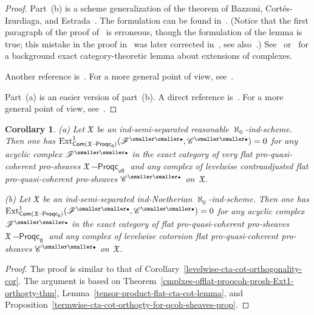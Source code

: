 \documentclass[12pt,a4paper]{amsart}
\newcommand{\+}{\protect\nobreakdash-}
\renewcommand{\:}{\colon}
\newcommand{\bu}{{\text{\smaller\smaller$\scriptstyle\bullet$}}}
\DeclareMathOperator{\Ext}{Ext}
\newcommand{\Proqc}{{\operatorname{\mathsf{--Proqc}}}}
\newcommand{\fl}{\mathsf{fl}}
\newcommand{\vfl}{\mathsf{vfl}}
\newcommand{\Com}{\mathsf{Com}}
\newcommand{\fX}{\mathfrak X}
\newcommand{\rC}{\mathscr C}
\newcommand{\rF}{\mathscr F}
\theoremstyle{plain}
\newtheorem{cor}[thm]{Corollary}
\theoremstyle{definition}
\begin{document}
\begin{proof}
 Part~(b) is a scheme generalization of the theorem of Bazzoni,
Cort\'es-Izurdiaga, and Estrada~\cite[Theorem~5.3]{BCE}.
 The formulation can be found in~\cite[Theorem~3.3]{CET}.
 (Notice that the first paragraph of the proof of~\cite[Lemma~3.2]{CET}
is erroneous, though the formulation of the lemma is true;
this mistake in the proof in~\cite{CET} was later corrected
in~\cite[Theorem~6.3(2)] {EGilO}, see also~\cite[Remark~6.7]{EGilO}.)
 See~\cite[Lemma~2.1]{Gil} or~\cite[Lemma~B.1.7]{Pcosh} for
a background exact category-theoretic lemma about extensions of
complexes.

 Another reference is~\cite[Lemma~5.1.1(b)]{Pcosh}.
 For a more general point of view, see~\cite[Proposition~2.1,
Theorem~3.3\,(2)\,$\Leftrightarrow$\,(4), and Example~8.9]{Pfltp}.

 Part~(a) is an easier version of part~(b).
 A direct reference is~\cite[Lemma~5.1.1(a)]{Pcosh}.
 For a more general point of view, see~\cite[Proposition~2.1,
Theorem~3.3\,(2)\,$\Leftrightarrow$\,(4), Corollary~6.5,
Lemma~6.7, and Example~6.12(1)]{Pfltp}.
\end{proof}

\begin{cor} \label{cmplxs-termwise-levelwise-cta-cot-orthogty-cor}
\textup{(a)} Let\/ $\fX$ be an ind-semi-separated reasonable\/
$\aleph_0$\+ind-scheme.
 Then one has\/ $\Ext_{\Com(\fX\Proqc_\fl)}^1(\rF^\bu,\rC^\bu)=0$
for any acyclic complex\/ $\rF^\bu$ in the exact category of very flat
pro-quasi-coherent pro-sheaves\/ $\fX\Proqc_\vfl$ and any complex of
levelwise contraadjusted flat pro-quasi-coherent pro-sheaves\/
$\rC^\bu$ on\/~$\fX$. \par
\textup{(b)} Let\/ $\fX$ be an ind-semi-separated ind-Noetherian\/ 
$\aleph_0$\+ind-scheme.
 Then one has\/ $\Ext_{\Com(\fX\Proqc_\fl)}^1(\rF^\bu,\rC^\bu)=0$
for any acyclic complex\/ $\rF^\bu$ in the exact category of flat
pro-quasi-coherent pro-sheaves\/ $\fX\Proqc_\fl$ and any complex of
levelwise cotorsion flat pro-quasi-coherent pro-sheaves\/ $\rC^\bu$
on\/~$\fX$.
\end{cor}

\begin{proof}
 The proof is similar to
that of Corollary~\ref{levelwise-cta-cot-orthogonality-cor}.
 The argument is based on
Theorem~\ref{cmplxes-offlat-proqcoh-prosh-Ext1-orthogty-thm},
Lemma~\ref{tensor-product-flat-cta-cot-lemma}, and
Proposition~\ref{termwise-cta-cot-orthogty-for-qcoh-sheaves-prop}.
\end{proof}
\end{document}
